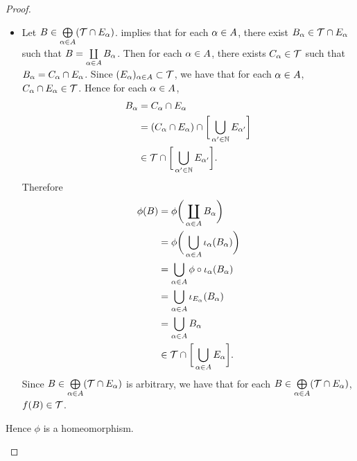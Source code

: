 \documentclass{book}
\begin{document}
\begin{proof}
\begin{itemize}
\begin{itemize}
				\item Let $B \in \bigoplus\limits_{\alpha \in A} (\mathcal{T} \cap E_{\alpha})$.  implies that for each $\alpha \in A$, there exist $B_{\alpha} \in \mathcal{T} \cap E_{\alpha}$ such that $B = \coprod\limits_{\alpha \in A} B_{\alpha}$. Then for each $\alpha \in A$, there exists $C_{\alpha} \in \mathcal{T}$ such that $B_{\alpha} = C_{\alpha} \cap E_{\alpha}$. Since $(E_{\alpha})_{\alpha \in A} \subset \mathcal{T}$, we have that for each $\alpha \in A$, $C_{\alpha} \cap E_{\alpha} \in \mathcal{T}$. Hence for each $\alpha \in A$, 
				\begin{align*}
					B_{\alpha}
					& = C_{\alpha} \cap E_{\alpha} \\
					& = (C_{\alpha} \cap E_{\alpha}) \cap \bigg[ \bigcup\limits_{\alpha' \in \mathbb{N}} E_{\alpha'} \bigg] \\
					& \in \mathcal{T} \cap \bigg[ \bigcup\limits_{\alpha' \in \mathbb{N}} E_{\alpha'} \bigg].
				\end{align*}
				Therefore
				\begin{align*}
					\phi(B)
					& = \phi \bigg(\coprod\limits_{\alpha \in A} B_{\alpha}  \bigg) \\
					& = \phi \bigg( \bigcup_{\alpha \in A} \iota_{\alpha}(B_{\alpha}) \bigg) \\
					& = \bigcup_{\alpha \in A} \phi \circ \iota_{\alpha}(B_{\alpha}) \\
					& = \bigcup_{\alpha \in A} \iota_{E_{\alpha}}(B_{\alpha}) \\
					& = \bigcup_{\alpha \in A} B_{\alpha} \\
					& \in \mathcal{T} \cap \bigg[ \bigcup\limits_{\alpha \in A} E_{\alpha} \bigg].
				\end{align*}
				Since $B \in \bigoplus\limits_{\alpha \in A} (\mathcal{T} \cap E_{\alpha})$ is arbitrary, we have that for each $B \in \bigoplus\limits_{\alpha \in A} (\mathcal{T} \cap E_{\alpha})$, $f(B) \in \mathcal{T}$. 
			\end{itemize}
			Hence $\phi$ is a homeomorphism.
		\end{itemize}
	\end{proof}
	
	
	
	
	
	
	
	
	
	
	
	
	
	
	
	
	
	
	
	
	
	
	
	
	
	
	
\end{document}
